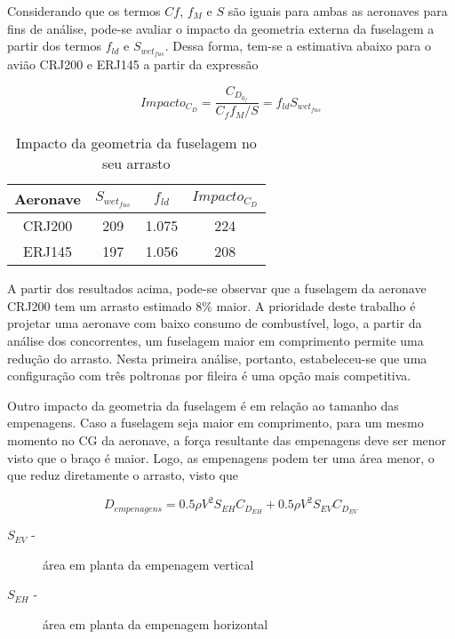 Considerando que os termos $Cf$, $f_M$ e $S$ são iguais para ambas as aeronaves para fins de análise, pode-se avaliar o impacto da geometria externa da fuselagem a partir dos termos $f_{ld}$ e $S_{wet_{fus}}$.
Dessa forma, tem-se a estimativa abaixo para o avião CRJ200 e ERJ145 a partir da expressão

\begin{equation}
Impacto_{C_D} = \frac{C_{D_{0_f}}}{ C_f f_M /S  } = f_{ld} S_{wet_{fus}}
\end{equation}

\begin{table}[H]
\centering
\begin{tabular}{cccc}
\toprule
Aeronave & $S_{wet_{fus}}$ & $f_{ld}$ & $Impacto_{C_D}$ \\ \midrule
CRJ200 & 209 & 1.075 & 224 \\
ERJ145 & 197 & 1.056 & 208 \\
\bottomrule
\end{tabular}
\caption[Arrasto da Fuselagem]{Impacto da geometria da fuselagem no seu arrasto}
\label{tbl:impacto_fus}
\end{table}

A partir dos resultados acima, pode-se observar que a fuselagem da aeronave CRJ200 tem um arrasto estimado $8\%$ maior. A prioridade deste trabalho é projetar uma aeronave com baixo consumo de combustível, logo, a partir da análise dos concorrentes, um fuselagem maior em comprimento permite uma redução do arrasto. Nesta primeira análise, portanto, estabeleceu-se que uma configuração com três poltronas por fileira é uma opção mais competitiva.

Outro impacto da geometria da fuselagem é em relação ao tamanho das empenagens. Caso a fuselagem seja maior em comprimento, para um mesmo momento no CG da aeronave, a força resultante das empenagens deve ser menor visto que o braço é maior. Logo, as empenagens podem ter uma área menor, o que reduz diretamente o arrasto, visto que

\begin{equation}
D_{empenagens} =  0.5 \rho V^2 S_{EH} C_{D_{EH}} + 0.5 \rho V^2 S_{EV} C_{D_{EV}}  
\end{equation}

\begin{description}
	\item[$S_{EV}$ -]área em planta da empenagem vertical
    \item[$S_{EH}$ -]área em planta da empenagem horizontal
\end{description}


